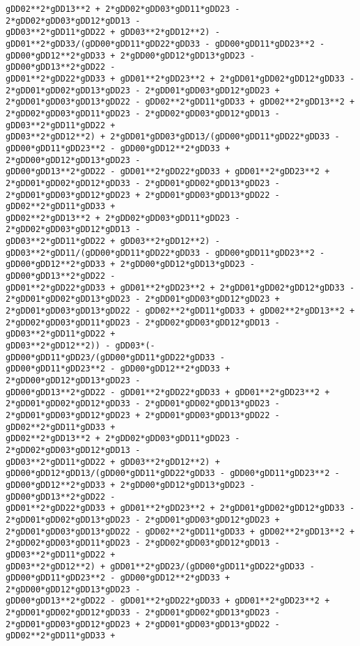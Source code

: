 \documentclass[landscape,letterpaper,10pt,english]{article}
\begin{document}
\begin{Verbatim}[commandchars=\\\{\}]
gDD02**2*gDD13**2 + 2*gDD02*gDD03*gDD11*gDD23 - 2*gDD02*gDD03*gDD12*gDD13 -
gDD03**2*gDD11*gDD22 + gDD03**2*gDD12**2) -
gDD01**2*gDD33/(gDD00*gDD11*gDD22*gDD33 - gDD00*gDD11*gDD23**2 -
gDD00*gDD12**2*gDD33 + 2*gDD00*gDD12*gDD13*gDD23 - gDD00*gDD13**2*gDD22 -
gDD01**2*gDD22*gDD33 + gDD01**2*gDD23**2 + 2*gDD01*gDD02*gDD12*gDD33 -
2*gDD01*gDD02*gDD13*gDD23 - 2*gDD01*gDD03*gDD12*gDD23 +
2*gDD01*gDD03*gDD13*gDD22 - gDD02**2*gDD11*gDD33 + gDD02**2*gDD13**2 +
2*gDD02*gDD03*gDD11*gDD23 - 2*gDD02*gDD03*gDD12*gDD13 - gDD03**2*gDD11*gDD22 +
gDD03**2*gDD12**2) + 2*gDD01*gDD03*gDD13/(gDD00*gDD11*gDD22*gDD33 -
gDD00*gDD11*gDD23**2 - gDD00*gDD12**2*gDD33 + 2*gDD00*gDD12*gDD13*gDD23 -
gDD00*gDD13**2*gDD22 - gDD01**2*gDD22*gDD33 + gDD01**2*gDD23**2 +
2*gDD01*gDD02*gDD12*gDD33 - 2*gDD01*gDD02*gDD13*gDD23 -
2*gDD01*gDD03*gDD12*gDD23 + 2*gDD01*gDD03*gDD13*gDD22 - gDD02**2*gDD11*gDD33 +
gDD02**2*gDD13**2 + 2*gDD02*gDD03*gDD11*gDD23 - 2*gDD02*gDD03*gDD12*gDD13 -
gDD03**2*gDD11*gDD22 + gDD03**2*gDD12**2) -
gDD03**2*gDD11/(gDD00*gDD11*gDD22*gDD33 - gDD00*gDD11*gDD23**2 -
gDD00*gDD12**2*gDD33 + 2*gDD00*gDD12*gDD13*gDD23 - gDD00*gDD13**2*gDD22 -
gDD01**2*gDD22*gDD33 + gDD01**2*gDD23**2 + 2*gDD01*gDD02*gDD12*gDD33 -
2*gDD01*gDD02*gDD13*gDD23 - 2*gDD01*gDD03*gDD12*gDD23 +
2*gDD01*gDD03*gDD13*gDD22 - gDD02**2*gDD11*gDD33 + gDD02**2*gDD13**2 +
2*gDD02*gDD03*gDD11*gDD23 - 2*gDD02*gDD03*gDD12*gDD13 - gDD03**2*gDD11*gDD22 +
gDD03**2*gDD12**2)) - gDD03*(-gDD00*gDD11*gDD23/(gDD00*gDD11*gDD22*gDD33 -
gDD00*gDD11*gDD23**2 - gDD00*gDD12**2*gDD33 + 2*gDD00*gDD12*gDD13*gDD23 -
gDD00*gDD13**2*gDD22 - gDD01**2*gDD22*gDD33 + gDD01**2*gDD23**2 +
2*gDD01*gDD02*gDD12*gDD33 - 2*gDD01*gDD02*gDD13*gDD23 -
2*gDD01*gDD03*gDD12*gDD23 + 2*gDD01*gDD03*gDD13*gDD22 - gDD02**2*gDD11*gDD33 +
gDD02**2*gDD13**2 + 2*gDD02*gDD03*gDD11*gDD23 - 2*gDD02*gDD03*gDD12*gDD13 -
gDD03**2*gDD11*gDD22 + gDD03**2*gDD12**2) +
gDD00*gDD12*gDD13/(gDD00*gDD11*gDD22*gDD33 - gDD00*gDD11*gDD23**2 -
gDD00*gDD12**2*gDD33 + 2*gDD00*gDD12*gDD13*gDD23 - gDD00*gDD13**2*gDD22 -
gDD01**2*gDD22*gDD33 + gDD01**2*gDD23**2 + 2*gDD01*gDD02*gDD12*gDD33 -
2*gDD01*gDD02*gDD13*gDD23 - 2*gDD01*gDD03*gDD12*gDD23 +
2*gDD01*gDD03*gDD13*gDD22 - gDD02**2*gDD11*gDD33 + gDD02**2*gDD13**2 +
2*gDD02*gDD03*gDD11*gDD23 - 2*gDD02*gDD03*gDD12*gDD13 - gDD03**2*gDD11*gDD22 +
gDD03**2*gDD12**2) + gDD01**2*gDD23/(gDD00*gDD11*gDD22*gDD33 -
gDD00*gDD11*gDD23**2 - gDD00*gDD12**2*gDD33 + 2*gDD00*gDD12*gDD13*gDD23 -
gDD00*gDD13**2*gDD22 - gDD01**2*gDD22*gDD33 + gDD01**2*gDD23**2 +
2*gDD01*gDD02*gDD12*gDD33 - 2*gDD01*gDD02*gDD13*gDD23 -
2*gDD01*gDD03*gDD12*gDD23 + 2*gDD01*gDD03*gDD13*gDD22 - gDD02**2*gDD11*gDD33 +

\end{Verbatim}
\end{document}
